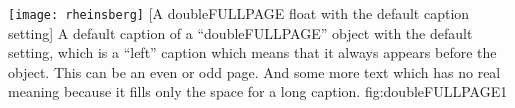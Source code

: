 \documentclass[twocolumn]{scrartcl}
\begin{document}
\Float[default]
%
  {\texttt{[image: rheinsberg]}}%
  [A doubleFULLPAGE float with the default caption setting]%
  {A default caption of a ``doubleFULLPAGE'' object with the default setting, which
   is a ``left''  caption which means that it always appears before the object.
   This can be an even or odd page. And some more text which has no
   real meaning because it fills only the space for a long caption.}%
  {fig:doubleFULLPAGE1}

\blinddocument

\Blindtext

\blindtext
\end{document}
